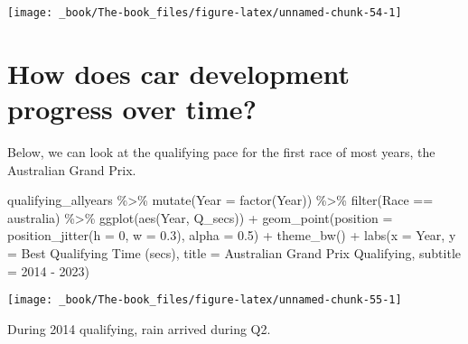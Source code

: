 \documentclass[
]{book}
\newenvironment{Shaded}{\begin{snugshade}}{\end{snugshade}}
\newcommand{\AttributeTok}[1]{\textcolor[rgb]{0.77,0.63,0.00}{#1}}
\newcommand{\DecValTok}[1]{\textcolor[rgb]{0.00,0.00,0.81}{#1}}
\newcommand{\FloatTok}[1]{\textcolor[rgb]{0.00,0.00,0.81}{#1}}
\newcommand{\FunctionTok}[1]{\textcolor[rgb]{0.00,0.00,0.00}{#1}}
\newcommand{\NormalTok}[1]{#1}
\newcommand{\SpecialCharTok}[1]{\textcolor[rgb]{0.00,0.00,0.00}{#1}}
\newcommand{\StringTok}[1]{\textcolor[rgb]{0.31,0.60,0.02}{#1}}
\begin{document}
\begin{center}\texttt{[image: \_book/The-book\_files/figure-latex/unnamed-chunk-54-1]} \end{center}

\hypertarget{how-does-car-development-progress-over-time}{%
\section{How does car development progress over time?}\label{how-does-car-development-progress-over-time}}

Below, we can look at the qualifying pace for the first race of most years, the Australian Grand Prix.

\begin{Shaded}
\begin{Highlighting}[]
\NormalTok{qualifying\_allyears }\SpecialCharTok{\%\textgreater{}\%}
  \FunctionTok{mutate}\NormalTok{(}\AttributeTok{Year =} \FunctionTok{factor}\NormalTok{(Year)) }\SpecialCharTok{\%\textgreater{}\%}
  \FunctionTok{filter}\NormalTok{(Race }\SpecialCharTok{==} \StringTok{\textquotesingle{}australia\textquotesingle{}}\NormalTok{) }\SpecialCharTok{\%\textgreater{}\%}
  \FunctionTok{ggplot}\NormalTok{(}\FunctionTok{aes}\NormalTok{(Year, Q\_secs)) }\SpecialCharTok{+}
  \FunctionTok{geom\_point}\NormalTok{(}\AttributeTok{position =} \FunctionTok{position\_jitter}\NormalTok{(}\AttributeTok{h =} \DecValTok{0}\NormalTok{, }\AttributeTok{w =} \FloatTok{0.3}\NormalTok{), }\AttributeTok{alpha =} \FloatTok{0.5}\NormalTok{) }\SpecialCharTok{+}
  \FunctionTok{theme\_bw}\NormalTok{() }\SpecialCharTok{+}
  \FunctionTok{labs}\NormalTok{(}\AttributeTok{x =} \StringTok{\textquotesingle{}Year\textquotesingle{}}\NormalTok{,}
       \AttributeTok{y =} \StringTok{\textquotesingle{}Best Qualifying Time (secs)\textquotesingle{}}\NormalTok{,}
       \AttributeTok{title =} \StringTok{\textquotesingle{}Australian Grand Prix Qualifying\textquotesingle{}}\NormalTok{,}
       \AttributeTok{subtitle =} \StringTok{\textquotesingle{}2014 {-} 2023\textquotesingle{}}\NormalTok{)}
\end{Highlighting}
\end{Shaded}

\begin{center}\texttt{[image: \_book/The-book\_files/figure-latex/unnamed-chunk-55-1]} \end{center}

During 2014 qualifying, rain arrived during Q2.
\end{document}
